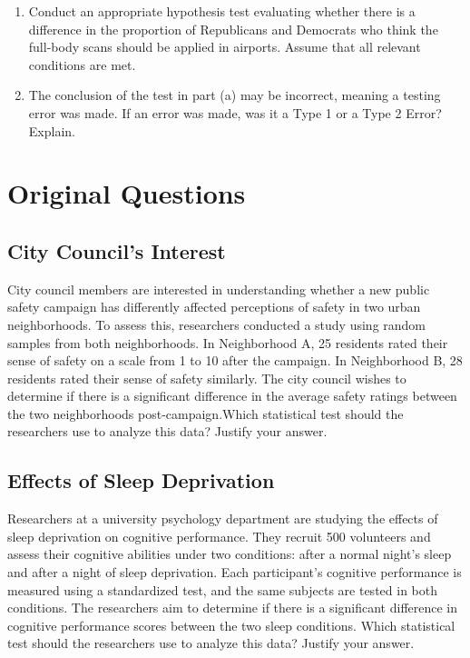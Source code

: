 \documentclass{article}
\begin{document}
\begin{enumerate}
    \item Conduct an appropriate hypothesis test evaluating whether there is a difference in the proportion of Republicans and Democrats who think the full-body scans should be applied in airports. Assume that all relevant conditions are met.
    \item The conclusion of the test in part (a) may be incorrect, meaning a testing error was made. If an error was made, was it a Type 1 or a Type 2 Error? Explain.
\end{enumerate}

\section*{Original Questions}

\subsection*{City Council's Interest}
City council members are interested in understanding whether a new public safety campaign has differently affected perceptions of safety in two urban neighborhoods. To assess this, researchers conducted a study using random samples from both neighborhoods. In Neighborhood A, 25 residents rated their sense of safety on a scale from 1 to 10 after the campaign. In Neighborhood B, 28 residents rated their sense of safety similarly. The city council wishes to determine if there is a significant difference in the average safety ratings between the two neighborhoods post-campaign.Which statistical test should the researchers use to analyze this data?
Justify your answer.


\subsection*{Effects of Sleep Deprivation}
Researchers at a university psychology department are studying the effects of sleep deprivation on cognitive performance. They recruit 500 volunteers and assess their cognitive abilities under two conditions: after a normal night’s sleep and after a night of sleep deprivation. Each participant's cognitive performance is measured using a standardized test, and the same subjects are tested in both conditions. The researchers aim to determine if there is a significant difference in cognitive performance scores between the two sleep conditions. Which statistical test should the researchers use to analyze this data?
Justify your answer.
\end{document}
